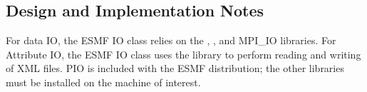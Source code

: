
\subsection{Design and Implementation Notes}

For data IO, the ESMF IO class relies on the 
, 
, 
and MPI\_IO libraries.  For Attribute IO, the ESMF IO class uses the 
 library to 
perform reading and writing of XML files.  PIO is included with the ESMF 
distribution; the other libraries must be installed on the machine of interest.
